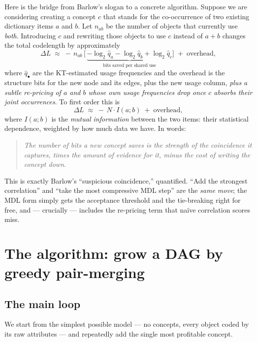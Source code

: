 \documentclass[11pt]{article}
\newcommand{\CL}{L}                       %
\begin{document}
Here is the bridge from Barlow's slogan to a concrete algorithm. Suppose we are
considering creating a concept $c$ that stands for the co-occurrence of two
existing dictionary items $a$ and $b$. Let $n_{ab}$ be the number of objects
that currently use \emph{both}. Introducing $c$ and rewriting those objects to
use $c$ instead of $a\!+\!b$ changes the total codelength by approximately
\begin{equation}
\Delta \CL \;\approx\; -\,n_{ab}\,\big[\,\underbrace{-\log_2 \hat q_a - \log_2\hat q_b + \log_2 \hat q_c}_{\text{bits saved per shared use}}\big]\;+\;\text{overhead},
\label{eq:delta}
\end{equation}
where $\hat q_{\bullet}$ are the KT-estimated usage frequencies and the overhead
is the structure bits for the new node and its edges, plus the new usage column,
\emph{plus a subtle re-pricing of $a$ and $b$ whose own usage frequencies drop
once $c$ absorbs their joint occurrences}. To first order this is
\[
  \Delta\CL \;\approx\; -\,N\cdot I(a;b)\;+\;\text{overhead},
\]
where $I(a;b)$ is the \emph{mutual information} between the two items: their
statistical dependence, weighted by how much data we have. In words:

\begin{quote}
\emph{The number of bits a new concept saves is the strength of the coincidence
it captures, times the amount of evidence for it, minus the cost of writing the
concept down.}
\end{quote}

This is exactly Barlow's ``suspicious coincidence,'' quantified. ``Add the
strongest correlation'' and ``take the most compressive MDL step'' are the
\emph{same move}; the MDL form simply gets the acceptance threshold and the
tie-breaking right for free, and --- crucially --- includes the re-pricing term
that na\"ive correlation scores miss.

\section{The algorithm: grow a DAG by greedy pair-merging}

\subsection{The main loop}

We start from the simplest possible model --- no concepts, every object coded by
its raw attributes --- and repeatedly add the single most profitable concept.
\end{document}
